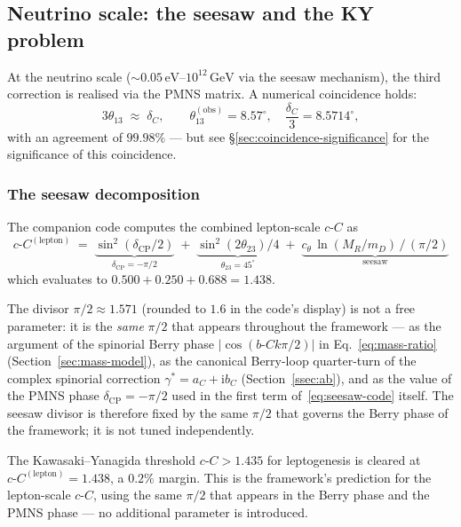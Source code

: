 \documentclass[11pt,a4paper]{article}
\newcommand{\dC}{\delta_C}
\newcommand{\bC}{b\text{-}C}
\newcommand{\cC}{c\text{-}C}
\providecommand{\ii}{}
\renewcommand{\ii}{\mathrm{i}}
\theoremstyle{plain}
\theoremstyle{definition}
\theoremstyle{remark}
\begin{document}
\subsection{Neutrino scale: the seesaw and the KY problem}
\label{ssec:neutrino}

At the neutrino scale ($\sim 0.05\,\mathrm{eV}\text{--}10^{12}\,
\mathrm{GeV}$ via the seesaw mechanism), the third correction is
realised via the PMNS matrix.  A numerical coincidence holds:
\begin{equation}\label{eq:3theta13}
  3\theta_{13} \;\approx\; \dC,
  \qquad
  \theta_{13}^{\mathrm{(obs)}} = 8.57^\circ, \quad
  \frac{\dC}{3} = 8.5714^\circ,
\end{equation}
with an agreement of $99.98\%$ --- but see \S\ref{sec:coincidence-significance}
for the significance of this coincidence.

\subsubsection{The seesaw decomposition}

The companion code computes the combined lepton-scale $\cC$ as
\begin{equation}\label{eq:seesaw-code}
  \cC^{\mathrm{(lepton)}}
  \;=\; \underbrace{\sin^2(\delta_{\mathrm{CP}}/2)}_{\delta_{\mathrm{CP}} = -\pi/2}
  \;+\; \underbrace{\sin^2(2\theta_{23})/4}_{\theta_{23} = 45^\circ}
  \;+\; \underbrace{c_\theta \,\ln(M_R/m_D)\,/\,(\pi/2)}_{\mathrm{seesaw}}
\end{equation}
which evaluates to $0.500 + 0.250 + 0.688 = 1.438$.

The divisor $\pi/2 \approx 1.571$ (rounded to $1.6$ in the code's
display) is not a free parameter: it is the \emph{same} $\pi/2$ that
appears throughout the framework --- as the argument of the
spinorial Berry phase $|\cos(\bC k \pi/2)|$ in
Eq.~\eqref{eq:mass-ratio} (Section~\ref{sec:mass-model}), as the
canonical Berry-loop quarter-turn of the complex spinorial
correction $\gamma^\ast = a_C + \ii b_C$ (Section~\ref{ssec:ab}),
and as the value of the PMNS phase $\delta_{\mathrm{CP}} = -\pi/2$
used in the first term of~\eqref{eq:seesaw-code} itself.  The
seesaw divisor is therefore fixed by the same $\pi/2$ that governs
the Berry phase of the framework; it is not tuned independently.

The Kawasaki--Yanagida threshold $\cC > 1.435$ for leptogenesis is
cleared at $\cC^{\mathrm{(lepton)}} = 1.438$, a $0.2\%$ margin.
This is the framework's prediction for the lepton-scale $\cC$,
using the same $\pi/2$ that appears in the Berry phase and the
PMNS phase --- no additional parameter is introduced.
\end{document}
